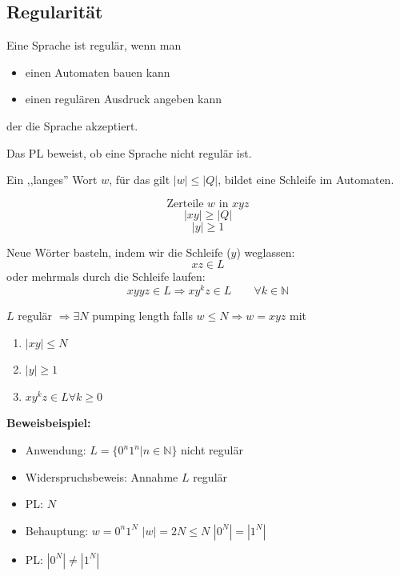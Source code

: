\documentclass[a4paper]{article}
\begin{document}
\subsection{Regularität}
	\begin{multicols}{2}
	Eine Sprache ist regulär, wenn man
	\begin{itemize}
		\item einen Automaten bauen kann
		\item einen regulären Ausdruck angeben kann
	\end{itemize}
	der die Sprache akzeptiert.
	
	\begin{fdef}
	Das PL beweist, ob eine Sprache nicht regulär ist.
	\end{fdef}
	
	\begin{fmerke}
	Ein ,,langes'' Wort $w$, für das gilt $|w| \le |Q|$, bildet eine Schleife im Automaten.
	
	$$\text{Zerteile $w$ in $xyz$}$$
	$$|xy| \ge |Q|$$
	$$|y| \ge 1$$
	
	Neue Wörter basteln, indem wir die Schleife ($y$) weglassen: 
	$$xz \in L$$
	oder mehrmals durch die Schleife laufen:
	$$xyyz \in L \Rightarrow xy^kz \in L \qquad \forall k \in \mathbb{N}$$				
	\end{fmerke}

	
	\begin{falgo}
	$L$ regulär $\Rightarrow \exists N$ pumping length falls $w \le N \Rightarrow w=xyz$ mit 
	\begin{enumerate}
		\item $|xy| \le N$
		\item $|y| \ge 1$
		\item $xy^{k}z \in L \forall k \ge 0$
	\end{enumerate} 
	\end{falgo}
	
	\textbf{Beweisbeispiel:}
	\begin{itemize}
		\item Anwendung: $L=\{0^n1^n | n \in \mathbb{N}\}$ nicht regulär 
		\item Widerspruchsbeweis: Annahme $L$ regulär
		\item PL: $N$
		\item Behauptung: $w=0^n1^N$   $|w| = 2N \le N$   $|0^N| = |1^N|$
		\item PL: $|0^N| \neq |1^N|$
	\end{itemize}
	
	\end{multicols}	
	
\end{document}
